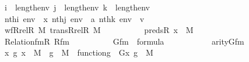 \begin{isabellebody}
\ \ \ \ \ \ \ \ \ \ {\isachardoublequoteopen}i\ {\isacharless}{\kern0pt}\ length{\isacharparenleft}{\kern0pt}env{\isacharparenright}{\kern0pt}{\isachardoublequoteclose}\ {\isachardoublequoteopen}j\ {\isacharless}{\kern0pt}\ length{\isacharparenleft}{\kern0pt}env{\isacharparenright}{\kern0pt}{\isachardoublequoteclose}\ {\isachardoublequoteopen}k\ {\isacharless}{\kern0pt}\ length{\isacharparenleft}{\kern0pt}env{\isacharparenright}{\kern0pt}{\isachardoublequoteclose}\ \isanewline
\ \ \ \ \ \ \ \ \ \ {\isachardoublequoteopen}nth{\isacharparenleft}{\kern0pt}i{\isacharcomma}{\kern0pt}\ env{\isacharparenright}{\kern0pt}\ {\isacharequal}{\kern0pt}\ x{\isachardoublequoteclose}\ {\isachardoublequoteopen}nth{\isacharparenleft}{\kern0pt}j{\isacharcomma}{\kern0pt}\ env{\isacharparenright}{\kern0pt}\ {\isacharequal}{\kern0pt}\ a{\isachardoublequoteclose}\ {\isachardoublequoteopen}nth{\isacharparenleft}{\kern0pt}k{\isacharcomma}{\kern0pt}\ env{\isacharparenright}{\kern0pt}\ {\isacharequal}{\kern0pt}\ v{\isachardoublequoteclose}\ \isanewline
\ \ \ \ \ \ \ \ \ \ {\isachardoublequoteopen}wf{\isacharparenleft}{\kern0pt}Rrel{\isacharparenleft}{\kern0pt}R{\isacharcomma}{\kern0pt}\ M{\isacharparenright}{\kern0pt}{\isacharparenright}{\kern0pt}{\isachardoublequoteclose}\ {\isachardoublequoteopen}trans{\isacharparenleft}{\kern0pt}Rrel{\isacharparenleft}{\kern0pt}R{\isacharcomma}{\kern0pt}\ M{\isacharparenright}{\kern0pt}{\isacharparenright}{\kern0pt}{\isachardoublequoteclose}\isanewline
\ \ \ \ \ \ \ \ \ \ {\isachardoublequoteopen}preds{\isacharparenleft}{\kern0pt}R{\isacharcomma}{\kern0pt}\ x{\isacharparenright}{\kern0pt}\ {\isasymin}\ M{\isachardoublequoteclose}\ \isanewline
\ \ \ \ \ \ \ \ \ \ {\isachardoublequoteopen}Relation{\isacharunderscore}{\kern0pt}fm{\isacharparenleft}{\kern0pt}R{\isacharcomma}{\kern0pt}\ Rfm{\isacharparenright}{\kern0pt}{\isachardoublequoteclose}\isanewline
\ \ \ \ \ \ \ \ \ \ {\isachardoublequoteopen}Gfm\ {\isasymin}\ formula{\isachardoublequoteclose}\ \isanewline
\ \ \ \ \ \ \ \ \ \ {\isachardoublequoteopen}arity{\isacharparenleft}{\kern0pt}Gfm{\isacharparenright}{\kern0pt}\ {\isasymle}\ {}{\isachardoublequoteclose}\ \isanewline
\ \ \ \ \ \ \ \ \ \ {\isachardoublequoteopen}{\isasymAnd}x\ g{\isachardot}{\kern0pt}\ x\ {\isasymin}\ M\ {\isasymLongrightarrow}\ g\ {\isasymin}\ M\ {\isasymLongrightarrow}\ function{\isacharparenleft}{\kern0pt}g{\isacharparenright}{\kern0pt}\ {\isasymLongrightarrow}\ G{\isacharparenleft}{\kern0pt}x{\isacharcomma}{\kern0pt}\ g{\isacharparenright}{\kern0pt}\ {\isasymin}\ M{\isachardoublequoteclose}\ \isanewline

\end{isabellebody}
